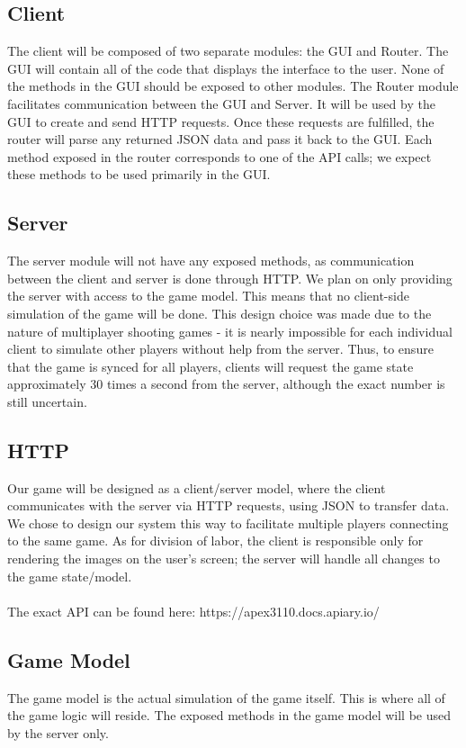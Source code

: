 \documentclass{article}
\begin{document}
	\subsection{Client}
	The client will be composed of two separate modules: the GUI and Router. The GUI will contain all of the code that displays the interface to the user. None of the methods in the GUI should be exposed to other modules. The Router module facilitates communication between the GUI and Server. It will be used by the GUI to create and send HTTP requests. Once these requests are fulfilled, the router will parse any returned JSON data and pass it back to the GUI. Each method exposed in the router corresponds to one of the API calls; we expect these methods to be used primarily in the GUI.

	\subsection{Server}
	The server module will not have any exposed methods, as communication between the client and server is done through HTTP. We plan on only providing the server with access to the game model. This means that no client-side simulation of the game will be done. This design choice was made due to the nature of multiplayer shooting games - it is nearly impossible for each individual client to simulate other players without help from the server. Thus, to ensure that the game is synced for all players, clients will request the game state approximately 30 times a second from the server, although the exact number is still uncertain.

        \subsection{HTTP}
       	Our game will be designed as a client/server model, where the client communicates with the server via HTTP requests, using JSON to transfer data. We chose to design our system this way to facilitate multiple players connecting to the same game. As for division of labor, the client is responsible only for rendering the images on the user's screen; the server will handle all changes to the game state/model. \\
	\\
	The exact API can be found here: https://apex3110.docs.apiary.io/

	\subsection{Game Model}
    	The game model is the actual simulation of the game itself. This is where all of the game logic will reside. The exposed methods in the game model will be used by the server only.
\end{document}
